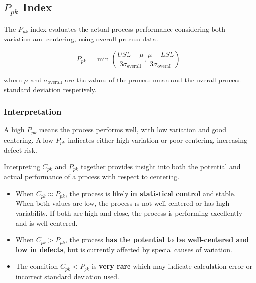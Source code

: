 \documentclass[twoside]{book}
\begin{document}
\subsection{$P_{pk}$ Index}

The $P_{pk}$ index evaluates the {actual process performance considering both variation and centering}, using overall process data.

\begin{textbox}
$$P_{pk} = \min\left(\dfrac{USL - \mu}{3\sigma_{\text{overall}}}, \dfrac{\mu - LSL}{3\sigma_{\text{overall}}}\right)$$
\end{textbox}

where $\mu$ and $\sigma_{\text{overall}}$ are the values of the process mean and the overall process standard deviation respetively.

\subsubsection{Interpretation}

A high $P_{pk}$ means the process performs well, with low variation and good centering. A low $P_{pk}$ indicates either high variation or poor centering, increasing defect risk.

Interpreting \(C_{pk}\) and \(P_{pk}\) together provides insight into both the potential and actual performance of a process with respect to centering.

\begin{itemize}
\item When \(C_{pk} \approx P_{pk}\), the process is likely \textbf{in statistical control} and stable. When both values are low, the process is not well-centered or has high variability. If both are high and close, the process is performing excellently and is well-centered.
\item When \(C_{pk} > P_{pk}\), the process \textbf{has the potential to be well-centered and low in defects}, but is currently affected by special causes of variation.
\item The condition \(C_{pk} < P_{pk}\) is \textbf{very rare} which may indicate calculation error or incorrect standard deviation used.
\end{itemize}


%
%
\end{document}
